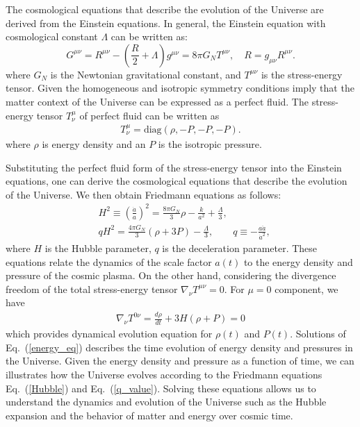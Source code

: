 The cosmological equations that describe the evolution of the Universe are derived from the Einstein equations. In general, the Einstein equation with cosmological constant $\Lambda$ can be written as:
\begin{equation}\label{Einstein}
  G^{\mu\nu}=R^{\mu\nu}-\left(\frac R 2 +\Lambda\right) g^{\mu\nu}=8\pi G_N T^{\mu\nu}, 
\quad R= g_{\mu\nu}R^{\mu\nu}.  
\end{equation}
where $G_{N}$ is the Newtonian gravitational constant, and $T^{\mu\nu}$ is the stress-energy tensor. Given the homogeneous and isotropic symmetry conditions imply that the matter context of the Universe can be expressed as a perfect fluid. The stress-energy tensor $T^\mu_\nu$ of perfect fluid can be written as
\begin{align}
 T^\mu_\nu =\mathrm{diag}(\rho, -P, -P, -P).
\end{align}
where $\rho$ is energy density and an $P$ is the isotropic pressure.

Substituting the perfect fluid form of the stress-energy tensor into the Einstein equations, one can derive the cosmological equations that describe the evolution of the Universe. We then obtain Friedmann equations as follows:
\begin{align}
\label{Hubble} 
&H^{2}\equiv\left(\frac{\dot a}{a}\right)^2=\frac{8\pi G_{N}}{3}\rho-\frac{k}{a^2}+\frac{\Lambda}{3},\\
\label{q_value}
&qH^2=\frac{4\pi G_{N}}{3}\left(\rho+3P\right)-\frac{\Lambda}{3},\qquad q\equiv -\frac{a\ddot a}{\dot a^2},
\end{align}
where $H$ is the Hubble parameter,  $q$ is the deceleration parameter. These equations relate the dynamics of the scale factor $a(t)$ to the energy density and pressure of the cosmic plasma. On the other hand, considering the divergence freedom of the total stress-energy tensor $\nabla_\nu T^{\mu\nu}=0$. For $\mu=0$ component, we have
\begin{align}\label{energy_eq}
\nabla_\nu T^{0\nu}=\frac{d\rho}{dt}+3H(\rho+P)=0
\end{align}
which provides dynamical evolution equation for $\rho(t)$ and $P(t)$. Solutions of Eq.~(\ref{energy_eq}) describes the time evolution of  energy density and pressures in the Universe. Given the energy density and pressure as a function of time, we can illustrates how the Universe evolves according to the Friedmann equations Eq.~(\ref{Hubble}) and Eq.~(\ref{q_value}). Solving these equations allows us to understand the dynamics and evolution of the Universe such as the Hubble expansion and the behavior of matter and energy over cosmic time.





